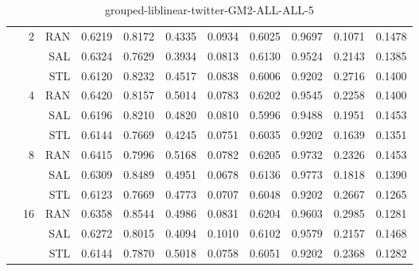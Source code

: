 \begin{center}
\begin{table}[htbp]
\begin{tabular}{ | r | r | r | r | r | r | r | r | r | r | r |}
 & \multirow{3}{*}{2} & RAN & 0.6219 & 0.8172 & 0.4335 & 0.0934 & 0.6025 & 0.9697 & 0.1071 & 0.1478\\ \cline{3-11}
 &   & SAL & 0.6324 & 0.7629 & 0.3934 & 0.0813 & 0.6130 & 0.9524 & 0.2143 & 0.1385\\ \cline{3-11}
 &   & STL & 0.6120 & 0.8232 & 0.4517 & 0.0838 & 0.6006 & 0.9202 & 0.2716 & 0.1400\\ \cline{2-11}
 & \multirow{3}{*}{4} & RAN & 0.6420 & 0.8157 & 0.5014 & 0.0783 & 0.6202 & 0.9545 & 0.2258 & 0.1400\\ \cline{3-11}
 &   & SAL & 0.6196 & 0.8210 & 0.4820 & 0.0810 & 0.5996 & 0.9488 & 0.1951 & 0.1453\\ \cline{3-11}
 &   & STL & 0.6144 & 0.7669 & 0.4245 & 0.0751 & 0.6035 & 0.9202 & 0.1639 & 0.1351\\ \cline{2-11}
 & \multirow{3}{*}{8} & RAN & 0.6415 & 0.7996 & 0.5168 & 0.0782 & 0.6205 & 0.9732 & 0.2326 & 0.1453\\ \cline{3-11}
 &   & SAL & 0.6309 & 0.8489 & 0.4951 & 0.0678 & 0.6136 & 0.9773 & 0.1818 & 0.1390\\ \cline{3-11}
 &   & STL & 0.6123 & 0.7669 & 0.4773 & 0.0707 & 0.6048 & 0.9202 & 0.2667 & 0.1265\\ \cline{2-11}
 & \multirow{3}{*}{16} & RAN & 0.6358 & 0.8544 & 0.4986 & 0.0831 & 0.6204 & 0.9603 & 0.2985 & 0.1281\\ \cline{3-11}
 &   & SAL & 0.6272 & 0.8015 & 0.4094 & 0.1010 & 0.6102 & 0.9579 & 0.2157 & 0.1468\\ \cline{3-11}
 &   & STL & 0.6144 & 0.7870 & 0.5018 & 0.0758 & 0.6051 & 0.9202 & 0.2368 & 0.1282\\ \cline{2-11}
\hline
\end{tabular}
\caption{grouped-liblinear-twitter-GM2-ALL-ALL-5}
\end{table}
\end{center}

